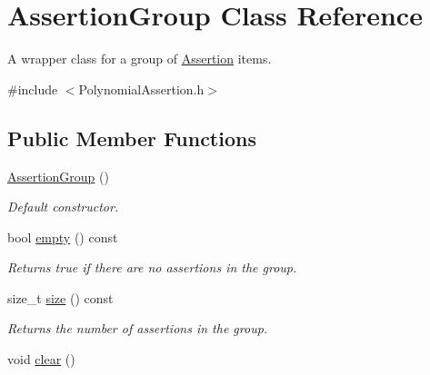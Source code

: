 \hypertarget{class_assertion_group}{\section{Assertion\-Group Class Reference}
\label{class_assertion_group}
}


A wrapper class for a group of \hyperlink{class_assertion}{Assertion} items.  




{\ttfamily \#include $<$Polynomial\-Assertion.\-h$>$}

\subsection*{Public Member Functions}
\begin{DoxyCompactItemize}
\item 
\hypertarget{class_assertion_group_ada3a7ad0a53c2b5ceae24e276f133f4b}{\hyperlink{class_assertion_group_ada3a7ad0a53c2b5ceae24e276f133f4b}{Assertion\-Group} ()}\label{class_assertion_group_ada3a7ad0a53c2b5ceae24e276f133f4b}

\begin{DoxyCompactList}\small\item\em Default constructor. \end{DoxyCompactList}\item 
\hypertarget{class_assertion_group_a0abcdc1872c8a3543196905f7811ac36}{bool \hyperlink{class_assertion_group_a0abcdc1872c8a3543196905f7811ac36}{empty} () const }\label{class_assertion_group_a0abcdc1872c8a3543196905f7811ac36}

\begin{DoxyCompactList}\small\item\em Returns true if there are no assertions in the group. \end{DoxyCompactList}\item 
\hypertarget{class_assertion_group_a9eaeb7fb32868ff5567cd9f90f5039ae}{size\-\_\-t \hyperlink{class_assertion_group_a9eaeb7fb32868ff5567cd9f90f5039ae}{size} () const }\label{class_assertion_group_a9eaeb7fb32868ff5567cd9f90f5039ae}

\begin{DoxyCompactList}\small\item\em Returns the number of assertions in the group. \end{DoxyCompactList}\item 
\hypertarget{class_assertion_group_a0f6c4ddf8d58e50e8d1ef8470ed7d0e8}{void \hyperlink{class_assertion_group_a0f6c4ddf8d58e50e8d1ef8470ed7d0e8}{clear} ()}\label{class_assertion_group_a0f6c4ddf8d58e50e8d1ef8470ed7d0e8}


\end{DoxyCompactItemize}
